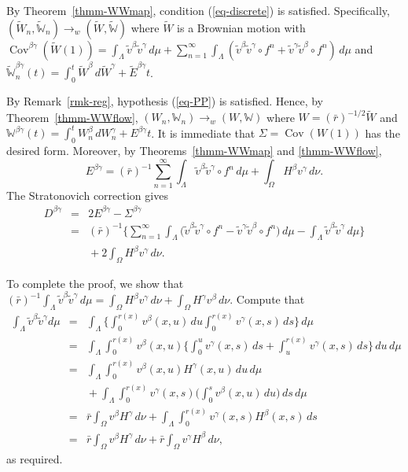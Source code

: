 \documentclass[aop,MSNbibl,seceqn,dvips]{arximspdf}
\newcommand{\eqref}[1]{(\ref{#1})}
\newcommand{\BBW}{\mathbb{W}}
\newcommand{\Cov}{\operatorname{Cov}}
\newcommand{\tildev}{\tilde{v}}
\newcommand{\tildeW}{\widetilde{W}}
\newcommand{\tildeBBW}{\widetilde{\mathbb W}}
\begin{document}
\begin{pf}
By Theorem~\ref{thmm-WWmap}, condition \eqref{eq-discrete} is satisfied.
Specifically,\break $(\tildeW_n,\tildeBBW_n)\to_w(\tildeW,\tildeBBW)$ where
$\tildeW$ is a Brownian motion with
$\Cov^{\beta\gamma}(\tildeW(1))= \int_\Lambda\tildev^\beta
\tildev
^\gamma \,d\mu+\sum_{n=1}^\infty\int_\Lambda(\tildev^\beta\tildev
^\gamma\circ f^n+\tildev^\gamma\tildev^\beta\circ f^n) \,d\mu$ and
$\tildeBBW_n^{\beta\gamma}(t)=\int_0^t \tildeW^\beta \,d\tildeW
^\gamma
+\tilde E^{\beta\gamma}t$.

By Remark~\ref{rmk-reg}, hypothesis \eqref{eq-PP} is satisfied.
Hence, by Theorem~\ref{thmm-WWflow},
$(W_n, \BBW_n)\to_w(W,\BBW)$ where $W=(\bar r)^{-1/2}\tildeW$ and
$\BBW^{\beta\gamma}(t)= \int_0^t W_n^\beta \,dW_n^\gamma+E^{\beta
\gamma}t$.
It is immediate that $\Sigma=\Cov(W(1))$ has the desired form.
Moreover, by Theorems~\ref{thmm-WWmap} and \ref{thmm-WWflow},
%
\[
E^{\beta\gamma}=(\bar r)^{-1}\sum_{n=1}^\infty
\int_\Lambda\tildev ^\beta \tildev^\gamma
\circ f^n \,d\mu+\int_\Omega H^\beta
v^\gamma \,d\nu.
\]
%
The Stratonovich correction gives
%
\begin{eqnarray*}
D^{\beta\gamma} & =&2E^{\beta\gamma}-\Sigma^{\beta\gamma}
\\
& = &(\bar r)^{-1} \Biggl\{\sum_{n=1}^\infty
\int_\Lambda\bigl(\tildev^\beta \tildev^\gamma
\circ f^n -\tildev^\gamma\tildev^\beta\circ
f^n\bigr) \,d\mu-\int_\Lambda\tildev ^\beta
\tildev^\gamma \,d\mu \Biggr\}\\
&&{}+2\int_\Omega
H^\beta v^\gamma \,d\nu.
\end{eqnarray*}

To complete the proof, we show that
$(\bar r)^{-1}\int_\Lambda\tildev^\beta\tildev^\gamma \,d\mu=
\int_{\Omega} H^\beta v^\gamma \,d\nu+
\int_{\Omega} H^\gamma v^\beta \,d\nu$.
Compute that
%
\begin{eqnarray*}
 \int_\Lambda\tildev^\beta\tildev^\gamma d
\mu &=& \int_\Lambda \biggl\{\int_0^{r(x)}v^\beta(x,u)
\,du \int_0^{r(x)}v^\gamma(x,s) \,ds \biggr
\}\,d\mu
\\
& =& \int_\Lambda \int_0^{r(x)}v^\beta(x,u)
\biggl\{ \int_0^uv^\gamma(x,s) \,ds+
\int_u^{r(x)}v^\gamma(x,s) \,ds \biggr\} \,du
\,d\mu
\\
& =& \int_\Lambda \int_0^{r(x)}v^\beta(x,u)
H^\gamma(x,u) \,du \,d\mu
\\
&&{} + \int_\Lambda \int_0^{r(x)}v^\gamma(x,s)
\biggl(\int_0^s v^\beta(x,u) \,du
\biggr) \,ds \,d\mu
\\
& = &\bar r\int_{\Omega}v^\beta H^\gamma \,d\nu
+ \int_\Lambda \int_0^{r(x)}v^\gamma(x,s)
H^\beta(x,s) \,ds
\\
& = &\bar r\int_{\Omega}v^\beta H^\gamma \,d\nu
+ \bar r\int_{\Omega}v^\gamma H^\beta \,d\nu,
\end{eqnarray*}
%
as required.
\end{pf}
\end{document}
